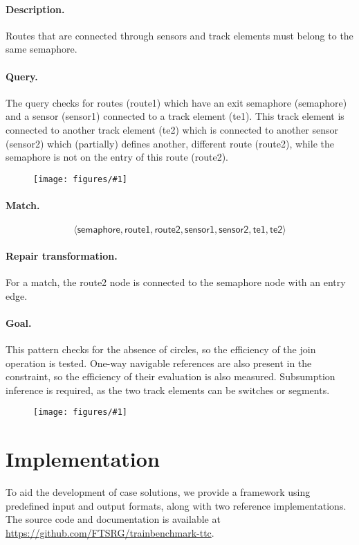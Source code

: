 \documentclass[submission,copyright,creativecommons]{eptcs}
\newcommand{\ttcpattern}[1]{
\begin{figure}[H] 
	\centering
	\texttt{[image: figures/\#1]}
\end{figure}}
\begin{document}
\paragraph{Description.} Routes that are connected through sensors and track elements must belong to the same semaphore.
\paragraph{Query.} The query checks for routes (\textsf{route1}) which have an exit semaphore (\textsf{semaphore}) and a sensor (\textsf{sensor1}) connected to a track element (\textsf{te1}). This track element is connected to another track element (\textsf{te2}) which is connected to another sensor (\textsf{sensor2}) which (partially) defines another, different route (\textsf{route2}), while the semaphore is not on the entry of this route (\textsf{route2}).
\ttcpattern{pattern-semaphoreneighbor}
\paragraph{Match.} $$\langle \mathsf{semaphore}, \mathsf{route1}, \mathsf{route2}, \mathsf{sensor1}, \mathsf{sensor2}, \mathsf{te1}, \mathsf{te2} \rangle$$
\paragraph{Repair transformation.} For a match, the \textsf{route2} node is connected to the \textsf{semaphore} node with an \textsf{entry} edge.
\paragraph{Goal.} This pattern checks for the absence of circles, so the efficiency of the join operation is tested. One-way navigable references are also present in the constraint, so the efficiency of their evaluation is also measured. Subsumption inference is required, as the two track elements can be switches or segments.
\ttcpattern{transformation-semaphoreneighbor}

\section{Implementation}

To aid the development of case solutions, we provide a framework using predefined input and output formats, along with two reference implementations. The source code and documentation is available at \url{https://github.com/FTSRG/trainbenchmark-ttc}.
\end{document}
